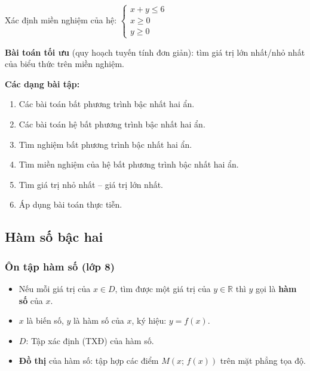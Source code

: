 \documentclass[12pt,a4paper]{article}
\begin{document}
\begin{vidu}
  Xác định miền nghiệm của hệ:
  $\begin{cases} x + y \le 6 \\ x \ge 0 \\ y \ge 0 \end{cases}$
\end{vidu}

\begin{luuy}
  \textbf{Bài toán tối ưu} (quy hoạch tuyến tính đơn giản): tìm giá trị lớn nhất/nhỏ nhất của biểu thức trên miền nghiệm.
\end{luuy}

\medskip\noindent\textbf{Các dạng bài tập:}
\begin{enumerate}[label=\textbf{Dạng \arabic*:}, leftmargin=*, align=left]
  \item Các bài toán bất phương trình bậc nhất hai ẩn.
  \item Các bài toán hệ bất phương trình bậc nhất hai ẩn.
  \item Tìm nghiệm bất phương trình bậc nhất hai ẩn.
  \item Tìm miền nghiệm của hệ bất phương trình bậc nhất hai ẩn.
  \item Tìm giá trị nhỏ nhất -- giá trị lớn nhất.
  \item Áp dụng bài toán thực tiễn.
\end{enumerate}

\subsection{Hàm số bậc hai}

\subsubsection{Ôn tập hàm số (lớp 8)}

\begin{dinhnghia}
  \begin{itemize}
    \item Nếu mỗi giá trị của $x \in D$, tìm được một giá trị của $y \in \mathbb{R}$ thì $y$ gọi là \textbf{hàm số} của $x$.
    \item $x$ là biến số, $y$ là hàm số của $x$, ký hiệu: $y = f(x)$.
    \item $D$: Tập xác định (TXĐ) của hàm số.
    \item \textbf{Đồ thị} của hàm số: tập hợp các điểm $M(x;\, f(x))$ trên mặt phẳng tọa độ.
  \end{itemize}
\end{dinhnghia}
\end{document}
